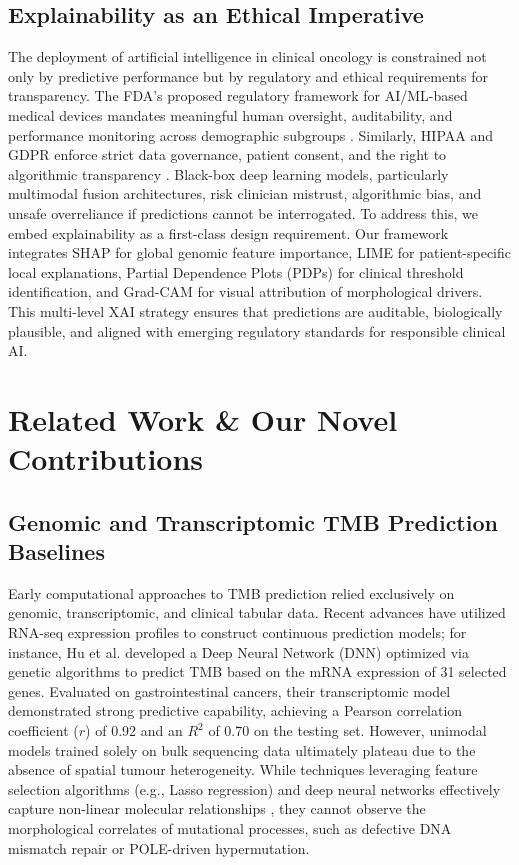 \documentclass[11pt,a4paper]{article}
\begin{document}
\subsection{Explainability as an Ethical Imperative}
The deployment of artificial intelligence in clinical oncology is constrained not only by predictive performance but by regulatory and ethical requirements for transparency. The FDA's proposed regulatory framework for AI/ML-based medical devices mandates meaningful human oversight, auditability, and performance monitoring across demographic subgroups \cite{fda2021}. Similarly, HIPAA and GDPR enforce strict data governance, patient consent, and the right to algorithmic transparency \cite{hipaa, gdpr}. Black-box deep learning models, particularly multimodal fusion architectures, risk clinician mistrust, algorithmic bias, and unsafe overreliance if predictions cannot be interrogated. To address this, we embed explainability as a first-class design requirement. Our framework integrates SHAP for global genomic feature importance, LIME for patient-specific local explanations, Partial Dependence Plots (PDPs) for clinical threshold identification, and Grad-CAM for visual attribution of morphological drivers. This multi-level XAI strategy ensures that predictions are auditable, biologically plausible, and aligned with emerging regulatory standards for responsible clinical AI.

\section{Related Work \& Our Novel Contributions}
\label{sec:related_work}

\subsection{Genomic and Transcriptomic TMB Prediction Baselines}
Early computational approaches to TMB prediction relied exclusively on genomic, transcriptomic, and clinical tabular data. Recent advances have utilized RNA-seq expression profiles to construct continuous prediction models; for instance, Hu et al. \cite{hu2024} developed a Deep Neural Network (DNN) optimized via genetic algorithms to predict TMB based on the mRNA expression of 31 selected genes. Evaluated on gastrointestinal cancers, their transcriptomic model demonstrated strong predictive capability, achieving a Pearson correlation coefficient ($r$) of 0.92 and an $R^2$ of 0.70 on the testing set. However, unimodal models trained solely on bulk sequencing data ultimately plateau due to the absence of spatial tumour heterogeneity. While techniques leveraging feature selection algorithms (e.g., Lasso regression) and deep neural networks effectively capture non-linear molecular relationships \cite{hu2024}, they cannot observe the morphological correlates of mutational processes, such as defective DNA mismatch repair or POLE-driven hypermutation.
\end{document}
